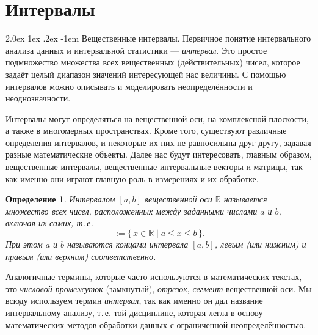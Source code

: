 \documentclass[a5paper,openany]{book}
\makeatletter
\newcommand{\mbb}{\mathbb}
\renewcommand\paragraph{\@startsection{paragraph}{4}{\z@}%
                         {2.0ex \@plus1ex \@minus.2ex}%
                         {-1em}%
                         {\normalfont\normalsize\bfseries}}
\newtheorem{definition}{Определение}[section]
\makeatother
\begin{document}
  
\section{Интервалы} 
\label{IntervalSect} 
  
    
\paragraph{Вещественные интервалы.} 
Первичное понятие интервального анализа данных и интервальной статистики 
--- \emph{интервал}. Это простое подмножество множества всех вещественных 
(действительных) чисел, которое задаёт целый диапазон значений интересующей нас 
величины. С помощью интервалов можно описывать и моделировать неопределённости 
и неоднозначности. 
  
Интервалы могут определяться на вещественной оси, на комплексной плоскости, 
а также в многомерных пространствах. Кроме того, существуют различные определения 
интервалов, и некоторые их них не равносильны друг другу, задавая разные 
математические объекты. Далее нас будут интересовать, главным образом, вещественные 
интервалы, вещественные интервальные векторы и матрицы, так как именно они играют 
главную роль в измерениях и их обработке. 
  
\begin{definition} 
\textsl{Интервалом} $[a,b]$ вещественной оси $\mbb{R}$ называется  
множество всех чисел, расположенных между заданными числами $a$ и $b$, 
включая их самих, т.\,е.                            
\begin{equation*} 
[a, b] := \{\, x\in\mbb{R} \mid a\leq x\leq b\,\}. 
\end{equation*} 
При этом $a$ и $b$ называются \textsl{концами} интервала $[a,b]$, \textsl{левым} 
(или нижним) и \textsl{правым} (или верхним) соответственно. 
\end{definition}
  
Аналогичные термины, которые часто используются в математических текстах, --- 
это \emph{числовой промежуток} (замкнутый), \emph{отрезок}, \emph{сегмент} 
вещественной оси. Мы всюду используем термин \emph{интервал}, так как именно он 
дал название интервальному анализу, т.\,е. той дисциплине, которая легла в основу 
математических методов обработки данных с ограниченной неопределённостью. 
  
  
\end{document}
